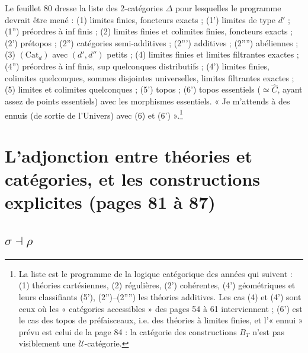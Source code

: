 \documentclass[11pt,a4paper]{article}
\begin{document}
Le feuillet 80 dresse la liste des 2-catégories $\Delta$ pour lesquelles
le programme devrait être mené : (1) limites finies, foncteurs exacts ;
(1') limites de type $d'$ ; (1'') préordres à inf finis ; (2) limites
finies et colimites finies, foncteurs exacts ; (2') prétopos ; (2'')
catégories semi-additives ; (2''') additives ; (2'''') abéliennes ; (3)
$(\mathrm{Cat}_{d})$ avec $(d', d'')$ petits ; (4) limites finies et limites
filtrantes exactes ; (4'') préordres à inf finis, sup quelconques
distributifs ; (4') limites finies, colimites quelconques, sommes
disjointes universelles, limites filtrantes exactes ; (5) limites et
colimites quelconques ; (5') topos ; (6') topos essentiels ($\simeq
\widehat{C}$, ayant assez de points essentiels) avec les morphismes
essentiels. « Je m'attends à des ennuis (de sortie de l'Univers) avec (6)
et (6') ».\footnote{La liste est le programme de la logique catégorique
des années qui suivent : (1) théories cartésiennes, (2) régulières, (2')
cohérentes, (4') géométriques et leurs classifiants (5'), (2'')--(2'''')
les théories additives. Les cas (4) et (4') sont ceux où les
« catégories accessibles » des pages 54 à 61 interviennent ; (6') est le
cas des topos de préfaisceaux, i.e. des théories à limites finies, et
l'« ennui » prévu est celui de la page 84 : la catégorie des constructions
$B_{T}$ n'est pas visiblement une $\mathcal{U}$-catégorie.}

\section*{L'adjonction entre théories et catégories, et les constructions explicites (pages 81 à 87)}

\subsection*{$\sigma \dashv \rho$}
\end{document}
